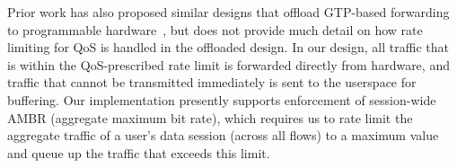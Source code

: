 Prior work has also proposed similar designs that offload GTP-based forwarding to programmable hardware~\cite{mobile_5G_hw1, mobile_5G_hw2, mavenir, kaloom_wp}, but does not provide much detail on how rate limiting for QoS is handled in the offloaded design. In our design, all traffic that is within the QoS-prescribed rate limit is forwarded directly from hardware, and traffic that cannot be transmitted immediately is sent to the userspace for buffering. Our implementation presently supports enforcement of session-wide AMBR (aggregate maximum bit rate), which requires us to rate limit the aggregate traffic of a user's data session (across all flows) to a maximum value and queue up the traffic that exceeds this limit. 
%
